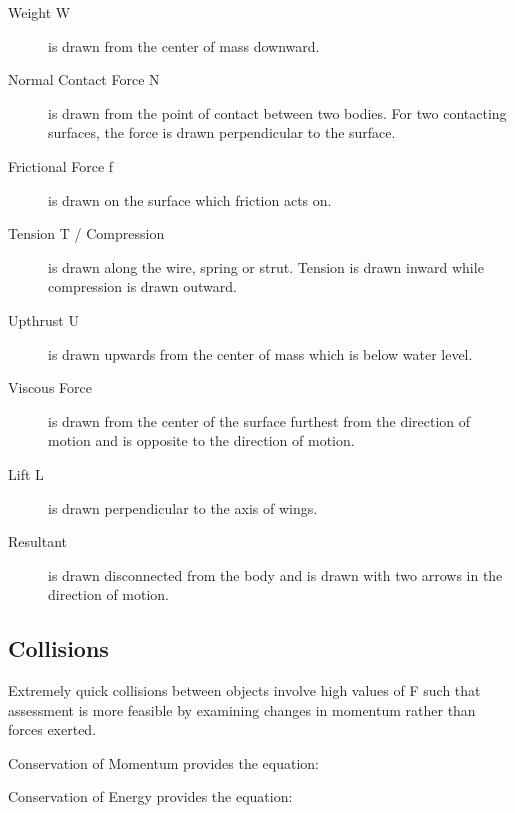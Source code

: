 \documentclass[../main]{subfiles}
\begin{document}
	\begin{description}
		\item[Weight W] is drawn from the center of mass downward.
		\item[Normal Contact Force N] is drawn from the point of contact between two bodies. For two contacting surfaces, the force is drawn perpendicular to the surface.
		\item[Frictional Force f] is drawn on the surface which friction acts on.
		\item[Tension T / Compression ] is drawn along the wire, spring or strut. Tension is drawn inward while compression is drawn outward.
		\item[Upthrust U] is drawn upwards from the center of mass which is below water level.
		\item[Viscous Force ] is drawn from the center of the surface furthest from the direction of motion and is opposite to the direction of motion.
		\item[Lift L] is drawn perpendicular to the axis of wings.
		\item[Resultant ] is drawn disconnected from the body and is drawn with two arrows in the direction of motion.
	\end{description}

	\subsection{Collisions}

	Extremely quick collisions between objects involve high values of F such that assessment is more feasible by examining changes in momentum rather than forces exerted.


	Conservation of Momentum provides the equation:



	Conservation of Energy provides the equation:

\end{document}
